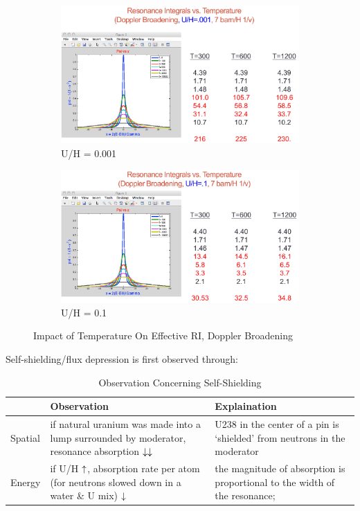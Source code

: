 \documentclass{school-22.211-notes}
\begin{document}
\begin{figure}
  \begin{subfigure}[b]{0.45\textwidth}
    \centering
    \includegraphics[width=\textwidth]{images/r-m/Doppler-RI-1.png}
    \caption{U/H = 0.001} \label{UH0.01}
  \end{subfigure}
  \begin{subfigure}[b]{0.45\textwidth}
    \centering
    \includegraphics[width=\textwidth]{images/r-m/Doppler-RI-2.png}
    \caption{U/H = 0.1} \label{UH0.1}
  \end{subfigure}
  \caption{Impact of Temperature On Effective RI, Doppler Broadening} \label{Doppler}
\end{figure}


\clearpage
Self-shielding/flux depression is first observed through: 
\begin{table}[ht]
  \centering
  \begin{tabular}{|l|p{6cm}|p{6cm}|} \hline
    & Observation & Explaination \\ \hline
    Spatial 
    & if natural uranium was made into a lump surrounded by moderator, resonance absorption $\downarrow \downarrow$  
    & U238 in the center of a pin is `shielded' from neutrons in the moderator \\ \hline
    Energy
    & if U/H $\uparrow$, absorption rate per atom (for neutrons slowed down in a water \& U mix) $\downarrow$   
    & the magnitude of absorption is proportional to the width of the resonance;  \\ \hline
  \end{tabular}
  \caption{Observation Concerning Self-Shielding}
  \end{table}
\end{document}
